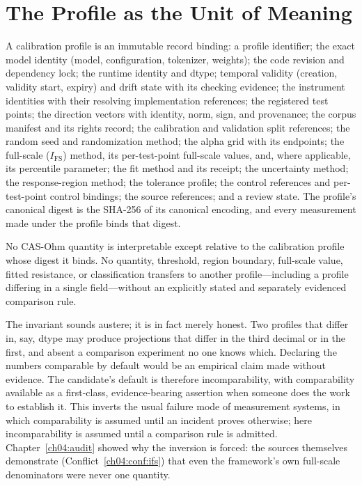 \section{The Profile as the Unit of Meaning}\label{ch05:unit}

\begin{definition}\label{ch05:def:profile}
A calibration profile is an immutable record binding: a profile identifier;
the exact model identity (model, configuration, tokenizer, weights); the
code revision and dependency lock; the runtime identity and dtype; temporal
validity (creation, validity start, expiry) and drift state with its
checking evidence; the instrument identities with their resolving
implementation references; the registered test points; the direction vectors with
identity, norm, sign, and provenance; the corpus manifest and its rights
record; the calibration and validation split references; the random seed and
randomization method; the alpha grid with its endpoints; the full-scale
($I_{\mathrm{FS}}$) method, its per-test-point full-scale values, and, where
applicable, its percentile parameter; the fit method and its receipt; the
uncertainty method; the response-region method; the tolerance profile; the
control references and per-test-point control bindings; the source
references; and a review state. The profile's canonical digest is the
SHA-256 of its canonical encoding, and every measurement made under the
profile binds that digest.
\end{definition}

\begin{invariant}\label{ch05:inv:relativity}
No CAS-Ohm quantity is interpretable except relative to the calibration
profile whose digest it binds. No quantity, threshold, region boundary,
full-scale value, fitted resistance, or classification transfers to another
profile---including a profile differing in a single field---without an
explicitly stated and separately evidenced comparison rule.
\end{invariant}

The invariant sounds austere; it is in fact merely honest. Two profiles that
differ in, say, dtype may produce projections that differ in the third
decimal or in the first, and absent a comparison experiment no one knows
which. Declaring the numbers comparable by default would be an empirical
claim made without evidence. The candidate's default is therefore
incomparability, with comparability available as a first-class,
evidence-bearing assertion when someone does the work to establish it. This
inverts the usual failure mode of measurement systems, in which comparability
is assumed until an incident proves otherwise; here incomparability is
assumed until a comparison rule is admitted. Chapter~\ref{ch04:audit} showed
why the inversion is forced: the sources themselves demonstrate
(Conflict~\ref{ch04:conf:ifs}) that even the framework's own full-scale
denominators were never one quantity.


